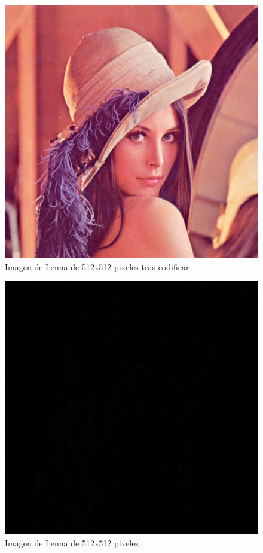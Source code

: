 \documentclass[%
	final,
	reprint,
	notitlepage,
	narroweqnarray,
	inline,
	twoside,
	invited
	]{ieee}
\begin{document}
\begin{thebibliography}{1}
\begin{figure}[H]
\centering
	\includegraphics[scale=0.7]{./img/lenaout.png}
	\caption{Imagen de Lenna de 512x512 pixeles tras codificar}
\end{figure}

\begin{figure}[H]
\centering
	\includegraphics[scale=0.7]{./img/lenadif.png}
	\caption{Imagen de Lenna de 512x512 pixeles}
\end{figure}


\end{thebibliography}
\end{document}
